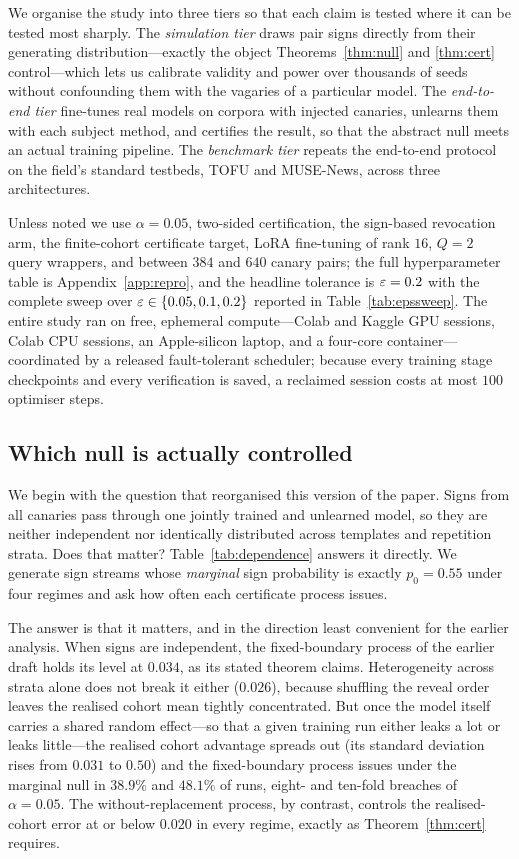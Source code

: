 We organise the study into three tiers so that each claim is tested where it can be
tested most sharply. The \emph{simulation tier} draws pair signs directly from their
generating distribution---exactly the object Theorems~\ref{thm:null} and
\ref{thm:cert} control---which lets us calibrate validity and power over thousands of
seeds without confounding them with the vagaries of a particular model. The
\emph{end-to-end tier} fine-tunes real models on corpora with injected canaries,
unlearns them with each subject method, and certifies the result, so that the abstract
null meets an actual training pipeline. The \emph{benchmark tier} repeats the
end-to-end protocol on the field's standard testbeds, TOFU and MUSE-News, across three
architectures.

Unless noted we use $\alpha = 0.05$, two-sided certification, the sign-based
revocation arm, the finite-cohort certificate target, LoRA fine-tuning of rank $16$,
$Q = 2$ query wrappers, and between $384$ and $640$ canary pairs; the full
hyperparameter table is Appendix~\ref{app:repro}, and the headline tolerance is
$\varepsilon = 0.2$ with the complete sweep over $\varepsilon \in \{0.05, 0.1, 0.2\}$ reported in
Table~\ref{tab:epssweep}. The entire study ran on free, ephemeral compute---Colab and
Kaggle GPU sessions, Colab CPU sessions, an Apple-silicon laptop, and a four-core
container---coordinated by a released fault-tolerant scheduler; because every training
stage checkpoints and every verification is saved, a reclaimed session costs at most
$100$ optimiser steps.

\subsection{Which null is actually controlled}\label{sec:exp-dependence}

We begin with the question that reorganised this version of the paper. Signs from all
canaries pass through one jointly trained and unlearned model, so they are neither
independent nor identically distributed across templates and repetition strata. Does
that matter? Table~\ref{tab:dependence} answers it directly. We generate sign streams
whose \emph{marginal} sign probability is exactly $p_0 = 0.55$ under four regimes and
ask how often each certificate process issues.

The answer is that it matters, and in the direction least convenient for the earlier
analysis. When signs are independent, the fixed-boundary process of the
earlier draft holds its level at $0.034$, as its stated theorem claims. Heterogeneity
across strata alone does not break it either ($0.026$), because shuffling the reveal
order leaves the realised cohort mean tightly concentrated. But once the model itself
carries a shared random effect---so that a given training run either leaks a lot or
leaks little---the realised cohort advantage spreads out (its standard deviation rises
from $0.031$ to $0.50$) and the fixed-boundary process issues under the marginal null
in $38.9\%$ and $48.1\%$ of runs, eight- and ten-fold breaches of $\alpha = 0.05$. The
without-replacement process, by contrast, controls the realised-cohort error at or
below $0.020$ in every regime, exactly as Theorem~\ref{thm:cert} requires.

